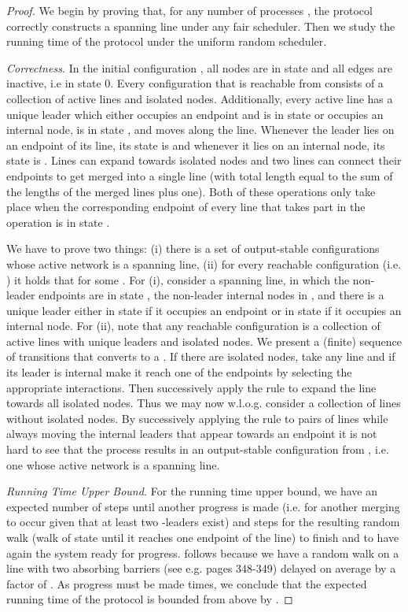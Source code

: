 \documentclass[oribibl, 11pt]{llncs}
\begin{document}
\begin{proof}
We begin by proving that, for any number of processes , the protocol correctly constructs a spanning line under any fair scheduler. Then we study the running time of the protocol under the uniform random scheduler.

\emph{Correctness.} In the initial configuration , all nodes are in state  and all edges are inactive, i.e in state 0. Every configuration  that is reachable from  consists of a collection of active lines and isolated nodes. Additionally, every active line has a unique leader which either occupies an endpoint and is in state  or occupies an internal node, is in state , and moves along the line. Whenever the leader lies on an endpoint of its line, its state is  and whenever it lies on an internal node, its state is . Lines can expand towards isolated nodes and two lines can connect their endpoints to get merged into a single line (with total length equal to the sum of the lengths of the merged lines plus one). Both of these operations only take place when the corresponding endpoint of every line that takes part in the operation is in state . 

We have to prove two things: (i) there is a set  of output-stable configurations whose active network is a spanning line, (ii) for every reachable configuration  (i.e. ) it holds that  for some . For (i), consider a spanning line, in which the non-leader endpoints are in state , the non-leader internal nodes in , and there is a unique leader either in state  if it occupies an endpoint or in state  if it occupies an internal node. For (ii), note that any reachable configuration  is a collection of active lines with unique leaders and isolated nodes. We present a (finite) sequence of transitions that converts  to a . If there are isolated nodes, take any line and if its leader is internal make it reach one of the endpoints by selecting the appropriate interactions. Then successively apply the rule  to expand the line towards all isolated nodes. Thus we may now w.l.o.g. consider a collection of lines without isolated nodes. By successively applying the rule  to pairs of lines while always moving the internal leaders that appear towards an endpoint it is not hard to see that the process results in an output-stable configuration from , i.e. one whose active network is a spanning line. 

\emph{Running Time Upper Bound.} For the running time upper bound, we have an expected number of  steps until another progress is made (i.e. for another merging to occur given that at least two -leaders exist) and  steps for the resulting random walk (walk of state  until it reaches one endpoint of the line) to finish and to have again the system ready for progress.  follows because we have a random walk on a line with two absorbing barriers (see e.g. \cite{Fe68} pages 348-349) delayed on average by a factor of . As progress must be made  times, we conclude that the expected running time of the protocol is bounded from above by .


\end{proof}
\end{document}
